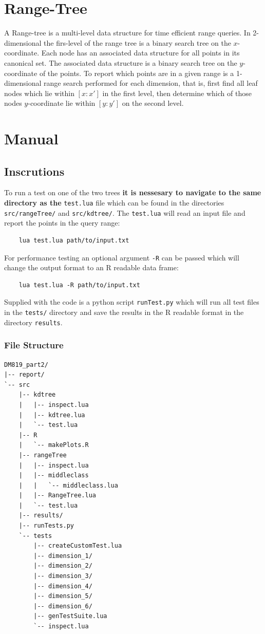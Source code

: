 \documentclass{article}
\begin{document}
\section{Range-Tree}
  A Range-tree is a multi-level data structure for time efficient range queries.
  In 2-dimensional the firs-level of the range tree is a binary search tree on 
  the $x$-coordinate. Each node has an associated data structure for all
  points in its canonical set. The associated data structure is a binary 
  search tree on the $y$-coordinate of the points. 
  To report which points are in a given range is a 1-dimensional range search 
  performed for each dimension, that is, first find all leaf nodes which lie 
  within $[x:x']$ in the first level, then determine which of those nodes 
  $y$-coordinate lie within $[y:y']$ on the second level. 
\section{Manual}
  \subsection{Inscrutions}
  To run a test on one of the two trees \textbf{it is nessesary to navigate to 
  the same directory as the} \verb|test.lua| file which can be found in the 
  directories \verb|src/rangeTree/| and \verb|src/kdtree/|.
  The \verb|test.lua| will read an input file and report the points in the query
  range:
  \begin{verbatim}
  	lua test.lua path/to/input.txt
  \end{verbatim}
  For performance testing an optional argument \verb|-R| can be passed which 
  will change the output format to an R readable data frame: 
  \begin{verbatim}
  	lua test.lua -R path/to/input.txt
  \end{verbatim}
  Supplied with the code is a python script \verb|runTest.py| which will run all 
  test files in the \verb|tests/| directory and save the results in the R 
  readable format in the directory \verb|results|.
\subsubsection{File Structure}
\begin{verbatim}
DM819_part2/
|-- report/
`-- src
    |-- kdtree
    |   |-- inspect.lua
    |   |-- kdtree.lua
    |   `-- test.lua
    |-- R
    |   `-- makePlots.R
    |-- rangeTree
    |   |-- inspect.lua
    |   |-- middleclass
    |   |   `-- middleclass.lua
    |   |-- RangeTree.lua
    |   `-- test.lua
    |-- results/
    |-- runTests.py
    `-- tests
        |-- createCustomTest.lua
        |-- dimension_1/
        |-- dimension_2/
        |-- dimension_3/
        |-- dimension_4/
        |-- dimension_5/
        |-- dimension_6/
        |-- genTestSuite.lua
        `-- inspect.lua
\end{verbatim}
  
\end{document}
